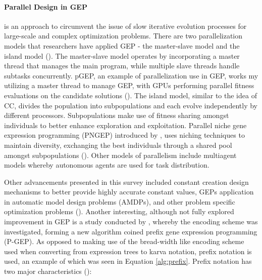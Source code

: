 \parbreak\noindent \paragraph{Parallel Design in GEP} is an approach to circumvent the issue of slow iterative evolution processes for large-scale and complex optimization problems. There are two parallelization models that researchers have applied GEP - the master-slave model and the island model (\cite{zhong2017gene}). The master-slave model operates by incorporating a master thread that manages the main program, while multiple slave threads handle subtasks concurrently. pGEP, an example of parallelization use in GEP, works my utilizing a master thread to manage GEP, with GPUs performing parallel fitness evaluations on the candidate solutions (\cite{zhong2017gene}). The island model, similar to the idea of CC, divides the population into subpopulations and each evolve independently by different processors. Subpopulations make use of fitness sharing amongst individuals to better enhance exploration and exploitation. Parallel niche gene expression programming (PNGEP) introduced by \cite{li2005prefix}, uses niching techniques to maintain  diversity, exchanging the best individuals through a shared pool amongst subpopulations (\cite{zhong2017gene}). Other models of parallelism include multiagent models whereby autonomous agents are used for task distribution.

\parbreak\noindent Other advancements presented in this survey included constant creation design mechanisms to better provide highly accurate constant values, GEPs application in automatic model design problems (AMDPs), and other problem specific optimization problems (\cite{zhong2017gene}). Another interesting, although not fully explored improvement in GEP is a study conducted by \cite{li2005prefix}, whereby the encoding scheme was investigated, forming a new algorithm coined prefix gene expression programming (P-GEP). As opposed to making use of the bread-width like encoding scheme used when converting from expression trees to karva notation, prefix notation is used, an example of which was seen in Equation \ref{alg:prefix}. Prefix notation has two major characteristics (\cite{li2005prefix}):

